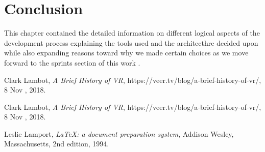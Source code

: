 \documentclass[]{report}
\begin{document}
\section{Conclusion}

This chapter contained the detailed information on different logical aspects of the development process explaining the tools used and the architecthre decided upon while also expanding reasons toward why we made certain choices as we move forward to the sprints section of this work .

\begin{thebibliography}{9}
	
	Clark Lambot,
	\textit{A Brief History of VR},
	https://veer.tv/blog/a-brief-history-of-vr/,
	8 Nov , 2018.
	
	Clark Lambot,
	\textit{A Brief History of VR},
	https://veer.tv/blog/a-brief-history-of-vr/,
	8 Nov , 2018.
	
	Leslie Lamport,
	\textit{\LaTeX: a document preparation system},
	Addison Wesley, Massachusetts,
	2nd edition,
	1994.
	
\end{thebibliography}
\end{document}

